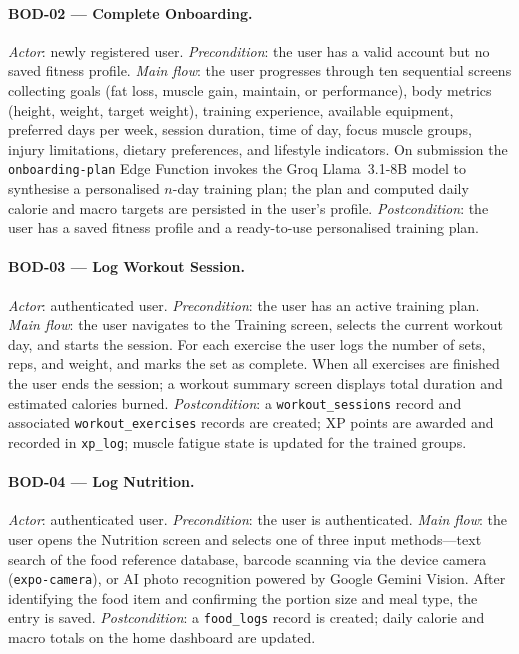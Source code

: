 \paragraph{BOD-02 — Complete Onboarding.}
\textit{Actor}: newly registered user.
\textit{Precondition}: the user has a valid account but no saved fitness
profile.
\textit{Main flow}: the user progresses through ten sequential screens
collecting goals (fat loss, muscle gain, maintain, or performance), body
metrics (height, weight, target weight), training experience, available
equipment, preferred days per week, session duration, time of day,
focus muscle groups, injury limitations, dietary preferences, and lifestyle
indicators. On submission the \texttt{onboarding-plan} Edge Function
invokes the Groq Llama~3.1-8B model to synthesise a personalised
$n$-day training plan; the plan and computed daily calorie and macro targets
are persisted in the user's profile.
\textit{Postcondition}: the user has a saved fitness profile and a
ready-to-use personalised training plan.

\paragraph{BOD-03 — Log Workout Session.}
\textit{Actor}: authenticated user.
\textit{Precondition}: the user has an active training plan.
\textit{Main flow}: the user navigates to the Training screen, selects the
current workout day, and starts the session. For each exercise the user
logs the number of sets, reps, and weight, and marks the set as complete.
When all exercises are finished the user ends the session; a workout summary
screen displays total duration and estimated calories burned.
\textit{Postcondition}: a \texttt{workout\_sessions} record and associated
\texttt{workout\_exercises} records are created; XP points are awarded and
recorded in \texttt{xp\_log}; muscle fatigue state is updated for the
trained groups.

\paragraph{BOD-04 — Log Nutrition.}
\textit{Actor}: authenticated user.
\textit{Precondition}: the user is authenticated.
\textit{Main flow}: the user opens the Nutrition screen and selects one of
three input methods---text search of the food reference database, barcode
scanning via the device camera (\texttt{expo-camera}), or AI photo
recognition powered by Google Gemini Vision. After identifying the food
item and confirming the portion size and meal type, the entry is saved.
\textit{Postcondition}: a \texttt{food\_logs} record is created; daily
calorie and macro totals on the home dashboard are updated.

